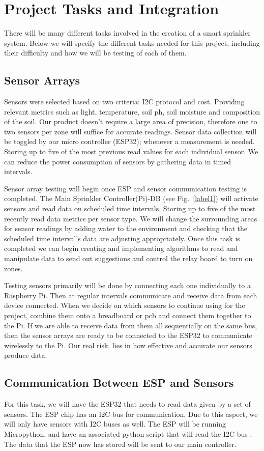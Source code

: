 \documentclass[letterpaper, 10 pt, conference]{ieeeconf}  %
\begin{document}
\section{Project Tasks and Integration}
There will be many different tasks involved in the creation of a smart sprinkler system. Below we will specify the different tasks needed for this project, including their difficulty and how we will be testing of each of them.

\subsection{Sensor Arrays}
Sensors were selected based on two criteria: I2C protocol and cost. Providing relevant metrics such as light, temperature, soil ph, soil moisture and composition of the soil. Our product doesn't require a large area of precision, therefore one to two sensors per zone will suffice for accurate readings. Sensor data collection will be toggled by our micro controller (ESP32); whenever a measurement is needed. Storing up to five of the most previous read values for each individual sensor. We can reduce the power consumption of sensors by gathering data in timed intervals.

Sensor array testing will begin once ESP and sensor communication testing is completed. The Main Sprinkler Controller(Pi)-DB (see Fig.~\ref{label1}) will activate sensors and read data on scheduled time intervals. Storing up to five of the most recently read data metrics per sensor type. We will change the surrounding areas for sensor readings by adding water to the environment and checking that the scheduled time interval's data are adjusting appropriately. Once this task is completed we can begin creating and implementing algorithms to read and manipulate data to send out suggestions and control the relay board to turn on zones.

Testing sensors primarily will be done by connecting each one individually to a Raspberry Pi. Then at regular intervals communicate and receive data from each device connected. When we decide on which sensors to continue using for the project, combine them onto a breadboard or pcb and connect them together to the Pi. If we are able to receive data from them all sequentially on the same bus, then the sensor arrays are ready to be connected to the ESP32 to communicate wirelessly to the Pi. Our real risk, lies in how effective and accurate our sensors produce data.

\subsection{Communication Between ESP and Sensors}
For this task, we will have the ESP32 that needs to read data given by a set of sensors. The ESP chip has an I2C bus for communication. Due to this aspect, we will only have sensors with I2C buses as well. The ESP will be running Micropython, and have an associated python script that will read the I2C bus \cite{LowCostBLE}. The data that the ESP now has stored will be sent to our main controller.
\end{document}
